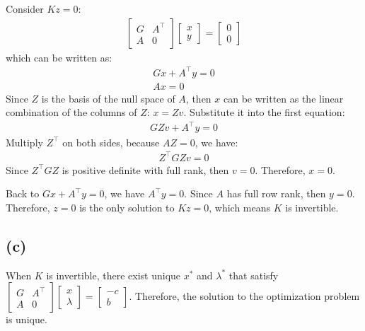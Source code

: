 \documentclass[12pt]{article}
\begin{document}
Consider $Kz = 0$:
\begin{align*}
    \left[\begin{array}{cc}
        G & A^\top \\
        A & 0
        \end{array}\right]\left[\begin{array}{c}
        x \\
        y
        \end{array}\right]=\left[\begin{array}{c}
        0 \\
        0
        \end{array}\right]
\end{align*}
which can be written as:
\begin{align*}
        G x+A^{\top} y=0 \\
        A x=0
\end{align*}
Since $Z$ is the basis of the null space of $A$, then $x$ can be written as the linear combination of the columns of $Z$: $x = Zv$. Substitute it into the first equation:
\begin{align*}
    GZv + A^\top y = 0
\end{align*}
Multiply $Z^\top$ on both sides, because $AZ=0$, we have:
\begin{align*}
    Z^\top GZv = 0
\end{align*}
Since $Z^\top GZ$ is positive definite with full rank, then $v = 0$. Therefore, $x = 0$.

Back to $G x+A^{\top} y=0$, we have $A^\top y = 0$. Since $A$ has full row rank, then $y = 0$. Therefore, $z = 0$ is the only solution to $Kz = 0$, which means $K$ is invertible.

\subsection*{(c)}

When $K$ is invertible, there exist unique $x^*$ and $\lambda^*$ that satisfy $\displaystyle \left[\begin{array}{cc}
    G & A^\top \\
    A & 0
    \end{array}\right]\left[\begin{array}{c}
    x \\
    \lambda
    \end{array}\right]=\left[\begin{array}{c}
    -c \\
    b
    \end{array}\right]$. Therefore, the solution to the optimization problem is unique.
\end{document}

